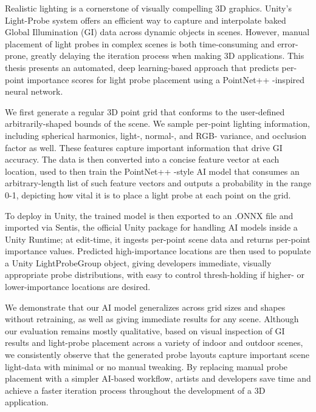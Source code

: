 Realistic lighting is a cornerstone of visually compelling 3D graphics. Unity's Light-Probe system offers an efficient way to capture and interpolate baked Global Illumination (GI) data across dynamic objects in scenes. However, manual placement of light probes in complex scenes is both time-consuming and error-prone, greatly delaying the iteration process when making 3D applications. This thesis presents an automated, deep learning-based approach that predicts per-point importance scores for light probe placement using a PointNet++ -inspired neural network.

We first generate a regular 3D point grid that conforms to the user-defined arbitrarily-shaped bounds of the scene. We sample per-point lighting information, including spherical harmonics, light-, normal-, and RGB- variance, and occlusion factor as well. These features capture important information that drive GI accuracy. The data is then converted into a concise feature vector at each location, used to then train the PointNet++ -style AI model that consumes an arbitrary-length list of such feature vectors and outputs a probability in the range 0-1, depicting how vital it is to place a light probe at each point on the grid.

To deploy in Unity, the trained model is then exported to an .ONNX file and imported via Sentis, the official Unity package for handling AI models inside a Unity Runtime; at edit-time, it ingests per-point scene data and returns per-point importance values. Predicted high-importance locations are then used to populate a Unity LightProbeGroup object, giving developers immediate, visually appropriate probe distributions, with easy to control thresh-holding if higher- or lower-importance locations are desired.

We demonstrate that our AI model generalizes across grid sizes and shapes without retraining, as well as giving immediate results for any scene. Although our evaluation remains mostly qualitative, based on visual inspection of GI results and light-probe placement across a variety of indoor and outdoor scenes, we consistently observe that the generated probe layouts capture important scene light-data with minimal or no manual tweaking. By replacing manual probe placement with a simpler AI-based workflow, artists and developers save time and achieve a faster iteration process throughout the development of a 3D application.
